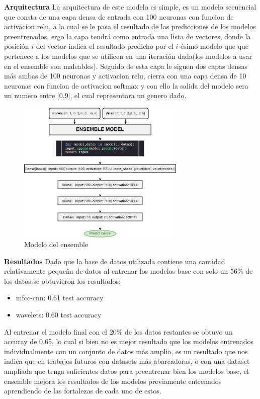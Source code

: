 \documentclass[colorinlistoftodos,twoside,twocolumn,10pt]{article} %
\begin{document}
\textbf{\large Arquitectura}
La arquitectura de este modelo es simple, es un modelo secuencial que consta de una capa densa de entrada con 100 neuronas con funcion de activacion relu, a la cual se le pasa el resultado de las predicciones de los modelos preentrenados, ergo la capa tendr\'a como entrada una lista de vectores, donde la posici\'on $i$ del vector indica el resultado predicho por el $i$-\'esimo modelo que que pertenece a los modelos que se utilicen en una iteraci\'on dada(los modelos a usar en el ensemble son maleables).
Seguido de esta capa le siguen dos capas densas m\'as ambas de 100 neuronas y activacion relu, cierra con una capa densa de 10 neuronas con funcion de activacion softmax y con ello la salida del modelo sera un numero entre [0,9], el cual representara un genero dado.

\begin{figure}[h!] %
	\centering
	\includegraphics[width=8cm]{ensemble.png}
	\caption{Modelo del ensemble}
\end{figure}
\textbf{\large Resultados}
Dado que la base de datos utilizada contiene una cantidad relativamente peque\~na de datos al entrenar los modelos base con solo un 56\% de los datos se obtuvieron los resultados: 

\begin{itemize}
\item mfcc-cnn: 0.61 test accuracy
\item wavelets: 0.60 test accuracy 
\end{itemize}

Al entrenar el modelo final con el 20\% de los datos restantes se obtuvo un accuray de 0.65, lo cual si bien no es mejor resultado que los modelos entrenados individualmente con un conjunto de datos m\'as amplio, es un resultado que nos indica que en trabajos futuros con datasets m\'as abarcadoras, o con una dataset ampliada que tenga suficientes datos para preentrenar bien los modelos base, el ensemble mejora los resultados de los modelos previamente entrenados aprendiendo de las fortalezas de cada uno de estos.
\end{document}
